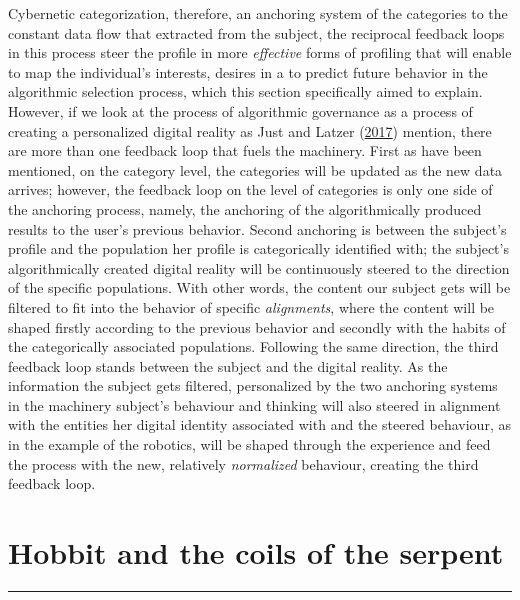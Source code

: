 \documentclass[12pt,twoside]{report}
\begin{document}
Cybernetic categorization, therefore, an anchoring system of the categories to the constant data flow that extracted from the subject, the reciprocal feedback loops in this process steer the profile in more \emph{effective} forms of profiling that will enable to map the individual's interests, desires in a to predict future behavior in the algorithmic selection process, which this section specifically aimed to explain. However, if we look at the process of algorithmic governance as a process of creating a personalized digital reality as Just and Latzer (\protect\hyperlink{ref-Just2017}{2017}) mention, there are more than one feedback loop that fuels the machinery. First as have been mentioned, on the category level, the categories will be updated as the new data arrives; however, the feedback loop on the level of categories is only one side of the anchoring process, namely, the anchoring of the algorithmically produced results to the user's previous behavior. Second anchoring is between the subject's profile and the population her profile is categorically identified with; the subject's algorithmically created digital reality will be continuously steered to the direction of the specific populations. With other words, the content our subject gets will be filtered to fit into the behavior of specific \emph{alignments}, where the content will be shaped firstly according to the previous behavior and secondly with the habits of the categorically associated populations. Following the same direction, the third feedback loop stands between the subject and the digital reality. As the information the subject gets filtered, personalized by the two anchoring systems in the machinery subject's behaviour and thinking will also steered in alignment with the entities her digital identity associated with and the steered behaviour, as in the example of the robotics, will be shaped through the experience and feed the process with the new, relatively \emph{normalized} behaviour, creating the third feedback loop.

\hypertarget{hob}{%
\chapter{Hobbit and the coils of the serpent}\label{hob}}

\begin{center}\rule{0.5\linewidth}{\linethickness}\end{center}
\end{document}
